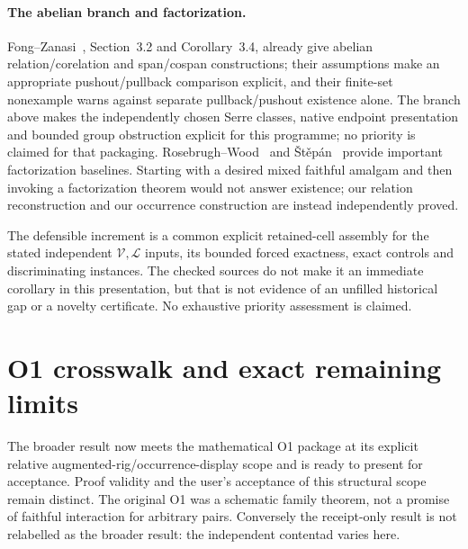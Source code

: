 \documentclass[11pt,a4paper]{article}
\theoremstyle{definition}
\newcommand{\V}{\mathcal V}
\newcommand{\Lcat}{\mathcal L}
\begin{document}
\paragraph{The abelian branch and factorization.}
Fong--Zanasi~\cite{FongZanasi}, Section~3.2 and Corollary~3.4, already give
abelian relation/corelation and span/cospan constructions; their assumptions
make an appropriate pushout/pullback comparison explicit, and their finite-set
nonexample warns against separate pullback/pushout existence alone.
The branch above makes the independently chosen Serre classes, native endpoint
presentation and bounded group obstruction explicit for this programme; no
priority is claimed for that packaging. Rosebrugh--Wood~\cite{RosebrughWood}
and \v{S}t\v{e}p\'an~\cite{Stepan} provide important factorization baselines.
Starting with a desired mixed faithful amalgam and then invoking a
factorization theorem would not answer existence; our relation reconstruction
and our occurrence construction are instead independently proved.

The defensible increment is a common explicit retained-cell assembly for the
stated independent $\V,\Lcat$ inputs, its bounded forced exactness, exact
controls and discriminating instances. The checked sources do not make it an
immediate corollary in this presentation, but that is not evidence of an
unfilled historical gap or a novelty certificate. No exhaustive priority
assessment is claimed.

\section{O1 crosswalk and exact remaining limits}\label{sec:acceptance}

The broader result now meets the mathematical O1 package at its explicit
relative augmented-rig/occurrence-display scope and is ready to present for
acceptance. Proof validity and the user's acceptance of this structural scope
remain distinct. The original O1 was a schematic family theorem, not a promise
of faithful interaction for arbitrary pairs. Conversely the receipt-only result
is not relabelled as the broader result: the independent contentad varies here.
\end{document}
